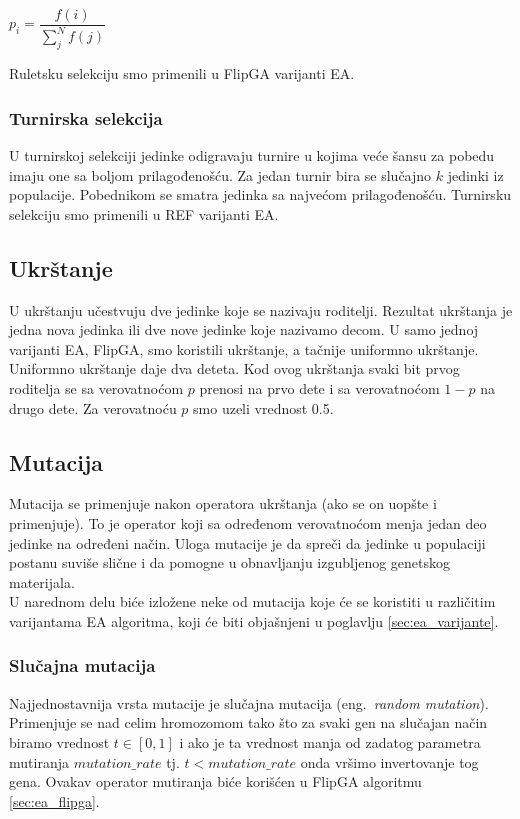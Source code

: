 \documentclass{article}
\begin{document}
\begin{center}
$p_i = \dfrac{f(i)}{\sum_{j}^{N} f(j)} $
\end{center}

Ruletsku selekciju smo primenili u FlipGA varijanti EA.

\subsubsection{Turnirska selekcija}
\label{sec:ea_turnirska}
U turnirskoj selekciji \cite{vi_Janicic} jedinke odigravaju turnire u kojima veće šansu za
pobedu imaju one sa boljom prilagođenošću. Za jedan turnir bira se slučajno $k$ jedinki iz
populacije. Pobednikom se smatra jedinka sa najvećom prilagođenošću. 
Turnirsku selekciju smo primenili u REF varijanti EA.

\subsection{Ukrštanje}
 \label{sec:ea_ukrstanje}
U ukrštanju \cite{vi_Janicic} učestvuju dve jedinke koje se nazivaju roditelji. 
Rezultat ukrštanja je jedna nova jedinka ili dve nove jedinke koje nazivamo decom. 
U samo jednoj varijanti EA, FlipGA, smo koristili ukrštanje, 
a tačnije uniformno ukrštanje.\\

Uniformno ukrštanje daje dva deteta. Kod ovog ukrštanja svaki bit prvog roditelja 
se sa verovatnoćom $p$ prenosi na prvo dete i sa verovatnoćom $1-p$ na drugo dete. 
Za verovatnoću $p$ smo uzeli vrednost 0.5. 

\subsection{Mutacija}
 \label{sec:ea_mutacija}
Mutacija \cite{vi_Janicic} se primenjuje nakon operatora ukrštanja (ako se on uopšte i primenjuje). 
To je operator koji sa određenom verovatnoćom menja jedan deo jedinke na određeni način. 
Uloga mutacije je da spreči da jedinke u populaciji postanu suviše slične 
i da pomogne u obnavljanju izgubljenog genetskog materijala.\\

U narednom delu biće izložene neke od mutacija koje će se koristiti u 
različitim varijantama EA algoritma, koji će biti objašnjeni u poglavlju \ref{sec:ea_varijante}.

\subsubsection{Slučajna mutacija}
\label{sec:ea_slucajna_mutacija}
Najjednostavnija vrsta mutacije je slučajna mutacija (eng.~{\em random mutation}).
Primenjuje se nad celim hromozomom tako što za svaki gen 
na slučajan način biramo vrednost $t \in [0,1]$ i ako je ta vrednost manja od zadatog
parametra mutiranja $mutation\_rate$ tj. $ t < mutation\_rate$ 
onda vršimo invertovanje tog gena.
Ovakav operator mutiranja biće korišćen u FlipGA algoritmu \ref{sec:ea_flipga}.
\end{document}
